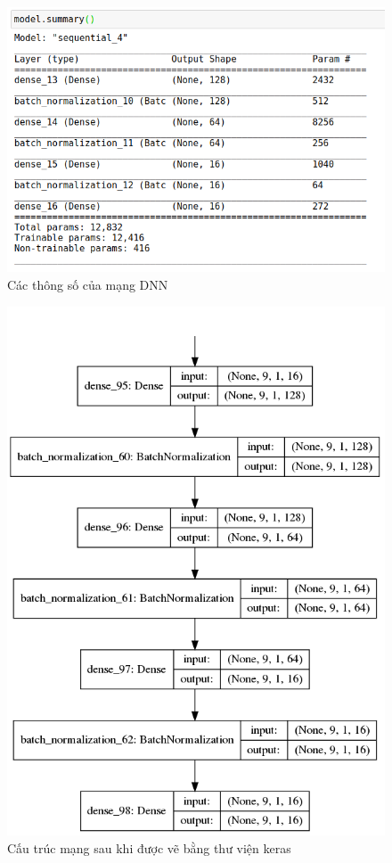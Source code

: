 \FloatBarrier
\begin{figure}[htp]
\begin{center}
\includegraphics[scale=1.3]{chap4/c4_figs/model_param.png}
\end{center}
\caption{Các thông số của mạng DNN}
\label{fig:model_params}
\end{figure}
\FloatBarrier

\FloatBarrier
\begin{figure}[htp]
\begin{center}
\includegraphics[scale=0.9]{chap4/c4_figs/model.png}
\end{center}
\caption{Cấu trúc mạng sau khi được vẽ bằng thư viện keras}
\label{fig:model}
\end{figure}
\FloatBarrier

